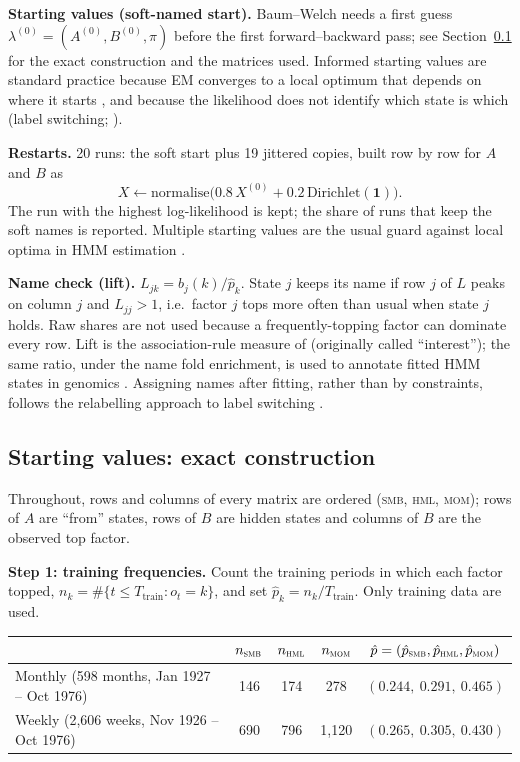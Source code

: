 \documentclass[11pt]{article}
\newcommand{\SMB}{\textsc{smb}}
\newcommand{\HML}{\textsc{hml}}
\newcommand{\MOM}{\textsc{mom}}
\begin{document}
\textbf{Starting values (soft-named start).} Baum--Welch needs a first guess $\lambda^{(0)}=(A^{(0)},B^{(0)},\pi)$ before the first forward--backward pass; see Section~\ref{sec:start} for the exact construction and the matrices used. Informed starting values are standard practice because EM converges to a local optimum that depends on where it starts \citep[p.~15]{jurafsky_slp3}, and because the likelihood does not identify which state is which (label switching; \citealp{stephens2000}).

\textbf{Restarts.} 20 runs: the soft start plus 19 jittered copies, built row by row for $A$ and $B$ as
\[
X\leftarrow\text{normalise}\big(0.8\,X^{(0)}+0.2\,\text{Dirichlet}(\mathbf 1)\big).
\] The run with the highest log-likelihood is kept; the share of runs that keep the soft names is reported. Multiple starting values are the usual guard against local optima in HMM estimation \citep{zucchini2016}.

\textbf{Name check (lift).} $L_{jk}=b_j(k)/\hat p_k$. State $j$ keeps its name if row $j$ of $L$ peaks on column $j$ and $L_{jj}>1$, i.e.\ factor $j$ tops more often than usual when state $j$ holds. Raw shares are not used because a frequently-topping factor can dominate every row. Lift is the association-rule measure of \citet{brin1997} (originally called ``interest''); the same ratio, under the name fold enrichment, is used to annotate fitted HMM states in genomics \citep{ernst2012,ernst2017}. Assigning names after fitting, rather than by constraints, follows the relabelling approach to label switching \citep{stephens2000}.

\subsection{Starting values: exact construction}\label{sec:start}
Throughout, rows and columns of every matrix are ordered (\SMB, \HML, \MOM); rows of $A$ are ``from'' states, rows of $B$ are hidden states and columns of $B$ are the observed top factor.

\textbf{Step 1: training frequencies.} Count the training periods in which each factor topped, $n_k=\#\{t\le T_{\text{train}}:o_t=k\}$, and set $\hat p_k=n_k/T_{\text{train}}$. Only training data are used.

\begin{center}
\begin{tabular}{lcccc}
\toprule
 & $n_{\textsc{smb}}$ & $n_{\textsc{hml}}$ & $n_{\textsc{mom}}$ & $\hat p=(\hat p_{\textsc{smb}},\hat p_{\textsc{hml}},\hat p_{\textsc{mom}})$ \\
\midrule
Monthly (598 months, Jan 1927 -- Oct 1976) & 146 & 174 & 278 & $(0.244,\ 0.291,\ 0.465)$ \\
Weekly (2{,}606 weeks, Nov 1926 -- Oct 1976) & 690 & 796 & 1{,}120 & $(0.265,\ 0.305,\ 0.430)$ \\
\bottomrule
\end{tabular}
\end{center}
\end{document}
